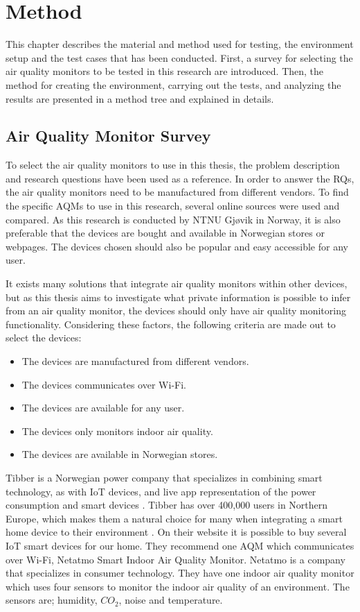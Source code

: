 \chapter{Method}
This chapter describes the material and method used for testing, the environment setup and the test cases that has been conducted. First, a survey for selecting the air quality monitors to be tested in this research are introduced. Then, the method for creating the environment, carrying out the tests, and analyzing the results are presented in a method tree and explained in details.  

\section{Air Quality Monitor Survey}
To select the air quality monitors to use in this thesis, the problem description and research questions have been used as a reference. In order to answer the RQs, the air quality monitors need to be manufactured from different vendors. To find the specific \gls{AQM}s to use in this research, several online sources were used and compared. As this research is conducted by NTNU Gjøvik in Norway, it is also preferable that the devices are bought and available in Norwegian stores or webpages. The devices chosen should also be popular and easy accessible for any user. 

It exists many solutions that integrate air quality monitors within other devices, but as this thesis aims to investigate what private information is possible to infer from an air quality monitor, the devices should only have air quality monitoring functionality.  Considering these factors, the following criteria are made out to select the devices:
\begin{itemize}
    \item The devices are manufactured from different vendors.
    \item The devices communicates over \gls{Wi-Fi}.
    \item The devices are available for any user.
    \item The devices only monitors indoor air quality.
    \item The devices are available in Norwegian stores.
\end{itemize}
Tibber \cite{Tibber} is a Norwegian power company that specializes in combining smart technology, as with \gls{IoT} devices, and live app representation of the power consumption and smart devices \cite{Tibber}.  Tibber has over 400,000 users in Northern Europe, which makes them a natural choice for many when integrating a smart home device to their environment \cite{TibberUsers}. On their website it is possible to buy several \gls{IoT} smart devices for our home. They recommend one \gls{AQM} which communicates over \gls{Wi-Fi}, Netatmo Smart Indoor Air Quality Monitor. Netatmo \cite{Netatmo} is a company that specializes in consumer technology. They have one indoor air quality monitor which uses four sensors to monitor the indoor air quality of an environment. The sensors are; humidity, \(CO_2\), noise and temperature. 

